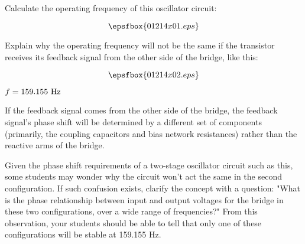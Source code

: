 

Calculate the operating frequency of this oscillator circuit:

$$\epsfbox{01214x01.eps}$$

Explain why the operating frequency will not be the same if the transistor receives its feedback signal from the other side of the bridge, like this:

$$\epsfbox{01214x02.eps}$$







$f = 159.155 \hbox{ Hz}$

\vskip 10pt

If the feedback signal comes from the other side of the bridge, the feedback signal's phase shift will be determined by a different set of components (primarily, the coupling capacitors and bias network resistances) rather than the reactive arms of the bridge.







Given the phase shift requirements of a two-stage oscillator circuit such as this, some students may wonder why the circuit won't act the same in the second configuration.  If such confusion exists, clarify the concept with a question: "What is the phase relationship between input and output voltages for the bridge in these two configurations, over a wide range of frequencies?"  From this observation, your students should be able to tell that only one of these configurations will be stable at 159.155 Hz.




